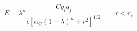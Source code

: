 


\[
E = \lambda^n \frac{ C q_i q_j}{\epsilon
\left[ \alpha_{\mathrm{C}} (1-\lambda)^n + r^2 \right]^{1/2}} \qquad r < r_c
\]


